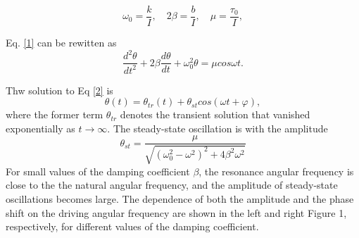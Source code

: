 \[
\omega_0=\frac{k}{I},\quad 2\beta=\frac{b}{I}, \quad \mu=\frac{\tau_0}{I}, 
\]

Eq. \ref{1} can be rewitten as
\begin{equation}
\label{2}
\frac{d^2\theta}{dt^2}+2\beta\frac{d\theta}{dt}+\omega_0^2\theta
=\mu cos\omega t.
\end{equation}

Thw solution to Eq \ref{2} is
\[
\theta(t)=\theta_{tr}(t)+\theta_{st}cos(\omega t+\varphi),
\]
where the former term $\theta_{tr}$ denotes the transient solution that vanished
exponentially as $t\rightarrow \infty$. The steady-state  oscillation is with
the amplitude 
\[
\theta_{st}=\frac{\mu}{\sqrt{(\omega_0^2-\omega^2)^2+4\beta^2\omega^2}}
\]
For small values of the damping coefficient $\beta$, the resonance angular
frequency is close to the the natural angular frequency, and the amplitude of
steady-state oscillations becomes large. The dependence of both the amplitude
and the phase shift on the driving angular frequency are shown in the left and
right Figure 1, respectively, for different values of the damping coefficient.